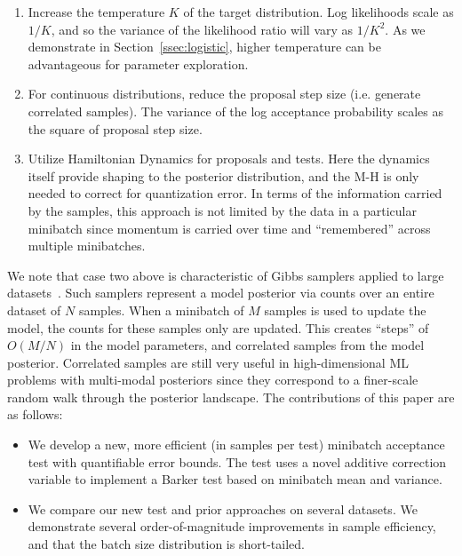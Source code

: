 \documentclass[letterpaper]{article}
\begin{document}
\begin{enumerate}[noitemsep]
    \item Increase the temperature $K$ of the target distribution. Log
    likelihoods scale as $1/K$, and so the variance of the likelihood ratio will
    vary as $1/K^2$. As we demonstrate in Section~\ref{ssec:logistic}, higher
    temperature can be advantageous for parameter exploration.

    \item For continuous distributions, reduce the proposal step size
      (i.e. generate correlated samples). The variance of the log
      acceptance probability scales as the square of proposal step
      size.

  \item Utilize Hamiltonian Dynamics for proposals and tests. Here the
    dynamics itself provide shaping to the posterior distribution, and
    the M-H is only needed to correct for quantization error. In terms
    of the information carried by the samples, this approach is not
    limited by the data in a particular minibatch since momentum is
    carried over time and ``remembered'' across multiple
    minibatches.
\end{enumerate}

We note that case two above is characteristic of Gibbs samplers applied to
large datasets~\citep{dupuy2016}. Such samplers represent a
model posterior via counts over an entire dataset of $N$ samples. When
a minibatch of $M$ samples is used to update the model, the counts for
these samples only are updated. This creates ``steps'' of $O(M/N)$
in the model parameters, and correlated samples from the model
posterior. Correlated samples are still very useful in high-dimensional
ML problems with multi-modal posteriors since they correspond to a finer-scale
random walk through the posterior landscape.  The contributions of this paper
are as follows:

\begin{itemize}[noitemsep]
    \item We develop a new, more efficient (in samples per test) minibatch
    acceptance test with quantifiable error bounds. The test uses a novel
    additive correction variable to implement a Barker test based on minibatch
    mean and variance. 

    \item We compare our new test and prior approaches on several
      datasets. We demonstrate several order-of-magnitude improvements in sample efficiency,
      and that the batch size distribution is short-tailed. 
\end{itemize}
\end{document}
